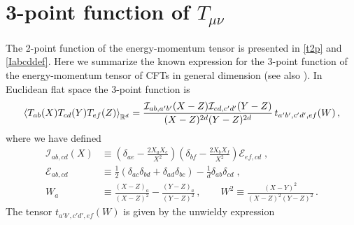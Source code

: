 \documentclass[12pt]{article}
\numberwithin{equation}{section}
\begin{document}
  
\appendix

\section{3-point function of $T_{\mu\nu}$}
\label{App:T3pt}


The 2-point function of the energy-momentum tensor is presented in \eqref{t2p} and \eqref{Iabcddef}. Here we summarize the known expression for the 3-point function of the energy-momentum tensor of CFTs in general dimension \cite{Osborn} (see also \cite{Erdmenger:1996yc,Hofman:2008ar,Buchel:2009sk}). In Euclidean flat space the 3-point function is
%
\begin{equation}
\braket{T_{ab}(X)T_{cd}(Y)T_{ef}(Z)}_{\mathbb{R}^d}=\frac{\mathcal{I}_{ab,a'b'}(X-Z)\mathcal{I}_{cd,c'd'}(Y-Z)}{(X-Z)^{2d}(Y-Z)^{2d}}\, t_{a'b',c'd',ef}(W)\, ,
\end{equation}
%
where we have defined
%
\begin{equation}
\begin{split}
	\mathcal{I}_{ab,cd}(X) &\equiv\left(\delta_{ae}-\frac{2X_a X_e}{X^2}\right) \left(\delta_{bf}-\frac{2X_b X_f}{X^2}\right)\mathcal{E}_{ef, cd}\;,\\
	\mathcal{E}_{ab,cd} &\equiv\frac{1}{2}(\delta_{ac}\delta_{bd}+\delta_{ad}\delta_{bc})-\frac{1}{d}\delta_{ab}\delta_{cd}\;,\\
	W_{a} &\equiv\frac{(X-Z)_a}{(X-Z)^2}-\frac{(Y-Z)_a}{(Y-Z)^2}\, , \qquad W^2\equiv\frac{(X-Y)^2}{(X-Z)^2(Y-Z)^2}\,.
\end{split}
\end{equation}
%
The tensor $t_{a'b',c'd',ef}(W)$ is given by the unwieldy expression
%
\end{document}
